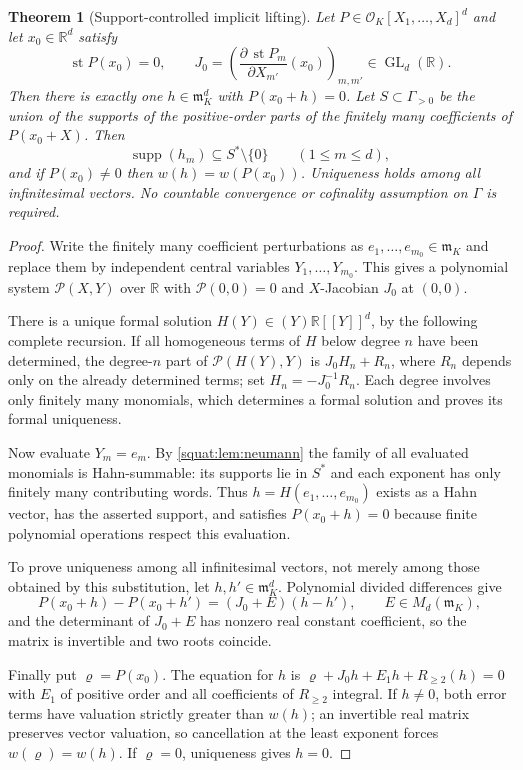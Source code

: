 \documentclass[11pt,letterpaper]{article}
\numberwithin{equation}{section}
\newtheorem{theorem}{Theorem}[section]
\theoremstyle{definition}
\theoremstyle{remark}
\newcommand{\R}{\mathbb R}
\newcommand{\OO}{\mathcal O}
\newcommand{\mm}{\mathfrak m}
\newcommand{\st}{\operatorname{st}}
\newcommand{\supp}{\operatorname{supp}}
\newcommand{\GL}{\operatorname{GL}}
\begin{document}
\begin{theorem}[Support-controlled implicit lifting]\label{squat:thm:lifting}
Let $P\in\OO_K[X_1,\ldots,X_d]^d$ and let $x_0\in\R^d$ satisfy
\[
 \st P(x_0)=0,\qquad
 J_0=\left(\frac{\partial\,\st P_m}{\partial X_{m'}}(x_0)\right)_{m,m'}\in\GL_d(\R).
\]
Then there is exactly one $h\in\mm_K^d$ with $P(x_0+h)=0$. Let
$S\subset\Gamma_{>0}$ be the union of the supports of the positive-order parts of the
finitely many coefficients of $P(x_0+X)$. Then
\[
 \supp(h_m)\subseteq S^*\setminus\{0\}\qquad(1\le m\le d),
\]
and if $P(x_0)\ne0$ then $w(h)=w(P(x_0))$. Uniqueness holds among \emph{all} infinitesimal
vectors. No countable convergence or cofinality assumption on $\Gamma$ is required.
\end{theorem}
\begin{proof}
Write the finitely many coefficient perturbations as $e_1,\ldots,e_{m_0}\in\mm_K$ and
replace them by independent central variables $Y_1,\ldots,Y_{m_0}$. This gives a polynomial
system $\mathcal P(X,Y)$ over $\R$ with $\mathcal P(0,0)=0$ and $X$-Jacobian $J_0$ at
$(0,0)$.

There is a unique formal solution $H(Y)\in(Y)\R[[Y]]^d$, by the following complete
recursion. If all homogeneous terms of $H$ below degree $n$ have been determined, the
degree-$n$ part of $\mathcal P(H(Y),Y)$ is $J_0H_n+R_n$, where $R_n$ depends only on the
already determined terms; set $H_n=-J_0^{-1}R_n$. Each degree involves only finitely many
monomials, which determines a formal solution and proves its formal uniqueness.

Now evaluate $Y_m=e_m$. By \cref{squat:lem:neumann} the family of all evaluated monomials
is Hahn-summable: its supports lie in $S^*$ and each exponent has only finitely many
contributing words. Thus $h=H(e_1,\ldots,e_{m_0})$ exists as a Hahn vector, has the
asserted support, and satisfies $P(x_0+h)=0$ because finite polynomial operations respect
this evaluation.

To prove uniqueness among all infinitesimal vectors, not merely among those obtained by
this substitution, let $h,h'\in\mm_K^d$. Polynomial divided differences give
\[
 P(x_0+h)-P(x_0+h')=(J_0+E)(h-h'),\qquad E\in M_d(\mm_K),
\]
and the determinant of $J_0+E$ has nonzero real constant coefficient, so the matrix is
invertible and two roots coincide.

Finally put $\varrho=P(x_0)$. The equation for $h$ is
$\varrho+J_0h+E_1h+R_{\ge2}(h)=0$ with $E_1$ of positive order and all coefficients of
$R_{\ge2}$ integral. If $h\ne0$, both error terms have valuation strictly greater than
$w(h)$; an invertible real matrix preserves vector valuation, so cancellation at the least
exponent forces $w(\varrho)=w(h)$. If $\varrho=0$, uniqueness gives $h=0$.
\end{proof}
\end{document}
